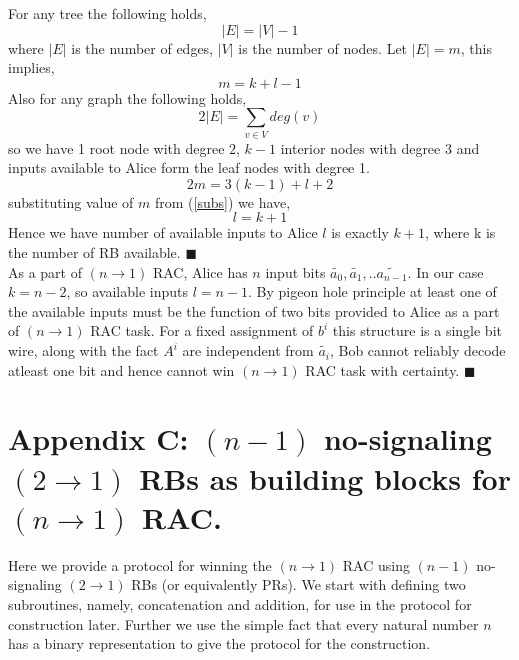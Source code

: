 For any tree the following holds,
\begin{equation}
|E|=|V|-1
\end{equation}
where $|E|$ is the number of edges, $|V|$ is the number of nodes. Let $|E|=m$, this implies,
\begin{equation} \label{subs}
m=k+l-1
\end{equation}
Also for any graph the following holds,
\begin{equation} 
2|E|=\sum_{v\in V}deg(v)
\end{equation}
so we have 1 root node with degree $2$, $k-1$ interior nodes with degree $3$ and inputs available to Alice form the leaf nodes with degree 1.  
\begin{equation}
2m=3(k-1)+l+2
\end{equation}
substituting value of $m$ from (\ref{subs}) we have,
\begin{equation}
l=k+1
\end{equation}
Hence we have number of available inputs to Alice $l$ is exactly $k+1$, where k is the number of RB available. $\blacksquare$ \\
As a part of $(n\rightarrow 1)$ RAC, Alice has $n$ input bits $\tilde{a_0},\tilde{a_1},..\tilde{a_{n-1}}$. In our case $k=n-2$, so available inputs $l=n-1$. By pigeon hole principle at least one of the available inputs must be the function of two bits provided to Alice as a part of $(n\rightarrow 1)$ RAC task. For a fixed assignment of $b^i$ this structure is a single bit wire, along with the fact $A^i$ are independent from $\tilde{a_i}$, Bob cannot reliably decode atleast one bit and hence cannot win $(n \rightarrow 1)$ RAC task with certainty. $\blacksquare$
\section*{Appendix C: $(n-1)$ no-signaling $(2\rightarrow 1)$ RBs as building blocks for $(n\rightarrow1)$ RAC.}
Here we provide a protocol for winning the $(n\rightarrow1)$ RAC using $(n-1)$ no-signaling $(2\rightarrow 1)$ RBs (or equivalently PRs). We start with defining two subroutines, namely, concatenation and addition, for use in the protocol for construction later. Further we use the simple fact that every natural number $n$ has a binary representation to give the protocol for the construction.   

